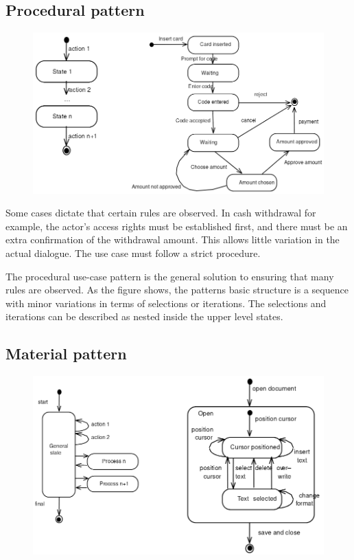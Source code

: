 \subsection{Procedural pattern}
\begin{figure}[H]
    \centering
    \includegraphics[width=.8\textwidth]{figures/proceduralpattern.png}
\end{figure}

Some cases dictate that certain rules are observed. In cash withdrawal for example, the actor's access rights must be established first, and there must be an extra confirmation of the withdrawal amount. This allows little variation in the actual dialogue. The use case must follow a strict procedure.

The procedural use-case pattern is the general solution to ensuring that many rules are observed. As the figure shows, the patterns basic structure is a sequence with minor variations in terms of selections or iterations. The selections and iterations can be described as nested inside the upper level states.

\subsection{Material pattern}
\begin{figure}[H]
    \centering
    \includegraphics[width=.7\textwidth]{figures/materialpattern.png}
\end{figure}

